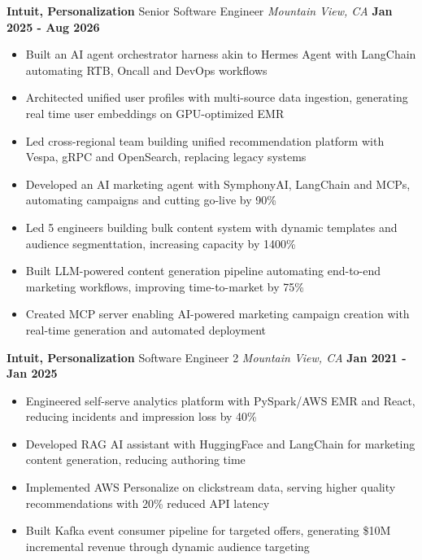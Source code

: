 \documentclass[10pt, letterpaper]{article}
\newcommand{\jobentry}[4]{
  \noindent\textbf{#1} \hfill #2 \hfill \textit{#3} \hfill \textbf{#4}
}
\begin{document}
\jobentry{Intuit, Personalization}{Senior Software Engineer}{Mountain View, CA}{Jan 2025 - Aug 2026}
\begin{itemize}
	\item Built an AI agent orchestrator harness akin to Hermes Agent with LangChain automating RTB, Oncall and DevOps workflows
	\item Architected unified user profiles with multi-source data ingestion, generating real time user embeddings on GPU-optimized EMR
	\item Led cross-regional team building unified recommendation platform with Vespa, gRPC and OpenSearch, replacing legacy systems
	\item Developed an AI marketing agent with SymphonyAI, LangChain and MCPs, automating campaigns and cutting go-live by 90\%
	\item Led 5 engineers building bulk content system with dynamic templates and audience segmenttation, increasing capacity by 1400\%
	\item Built LLM-powered content generation pipeline automating end-to-end marketing workflows, improving time-to-market by 75\%
	\item Created MCP server enabling AI-powered marketing campaign creation with real-time generation and automated deployment
\end{itemize}

\jobentry{Intuit, Personalization}{Software Engineer 2}{Mountain View, CA}{Jan 2021 - Jan 2025}
\begin{itemize}
	\item Engineered self-serve analytics platform with PySpark/AWS EMR and React, reducing incidents and impression loss by 40\%
	\item Developed RAG AI assistant with HuggingFace and LangChain for marketing content generation, reducing authoring time
	\item Implemented AWS Personalize on clickstream data, serving higher quality recommendations with 20\% reduced API latency
	\item Built Kafka event consumer pipeline for targeted offers, generating \$10M incremental revenue through dynamic audience targeting
\end{itemize}
\end{document}
